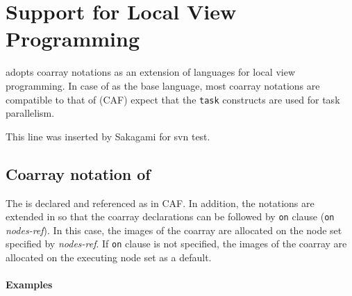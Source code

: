 \chapter{Support for Local View Programming}

\XMP adopts coarray notations as
an extension of languages for local view programming. In case of
\Fort as the base language, most coarray notations are compatible to
that of \CAF (CAF) expect that the {\tt task} constructs
are used for task parallelism.

This line was inserted by Sakagami for svn test.

\section{Coarray notation of  \XMP}

The  is declared and referenced as in CAF. In addition, the
notations are extended in \XMP so that the coarray declarations
can be followed by {\tt on} clause ({\tt on} {\it nodes-ref}). In this
case, the images of the coarray are allocated on the node set specified by
{\it nodes-ref}. If {\tt on} clause is not specified, the images of
the coarray are allocated on the executing node set as a default.

\subsubsection*{Examples}

